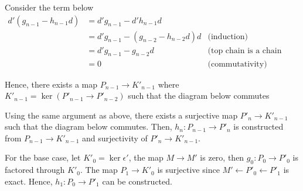 \documentclass{report}
\begin{document}
\begin{longproof}
\begin{enumerate}
    Consider the term below
    \begin{align*}
        d'(g_{n-1} - h_{n-1} d)
        &= d' g_{n-1} - d' h_{n-1} d \\
        &= d' g_{n-1} - (g_{n-2} - h_{n-2} d) d &\text{(induction)}\\
        &= d' g_{n-1} - g_{n-2} d &\text{(top chain is a chain complex)}\\
        &= 0 &\text{(commutativity)}
    \end{align*}

    Hence, there exists a map $P_{n-1} \to K'_{n-1}$ where $K'_{n-1} = \ker (P'_{n-1} \to P'_{n-2})$ such that the diagram below commutes

    \begin{center}
    \end{center}

    Using the same argument as above, there exists a surjective map $P'_n \to K'_{n-1}$ such that the diagram below commutes. Then, $h_n: P_{n-1} \to P'_n$ is constructed from $P_{n-1} \to K'_{n-1}$ and surjectivity of $P'_n \to K'_{n-1}$.

    \begin{center}
    \end{center}

    For the base case, let $K'_0 = \ker \epsilon'$, the map $M \to M'$ is zero, then $g_0: P_0 \to P'_0$ is factored through $K'_0$. The map $P_1 \to K'_0$ is surjective since $M' \leftarrow P'_0 \leftarrow P'_1$ is exact. Hence, $h_1: P_0 \to P'_1$ can be constructed.


\end{enumerate}
\end{longproof}
\end{document}
